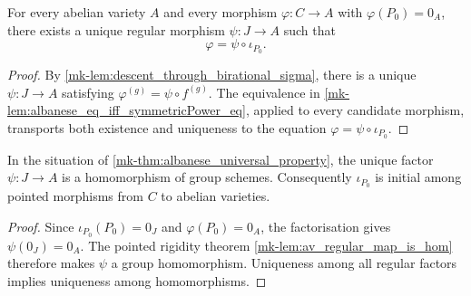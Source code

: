 \begin{theorem}
  \label{mk-thm:albanese_universal_property}


  For every abelian variety \(A\) and every morphism
  \(\varphi\colon C\to A\) with \(\varphi(P_0)=0_A\), there exists a unique
  regular morphism \(\psi\colon J\to A\) such that
  \[
    \varphi=\psi\circ\iota_{P_0}.
  \]
\end{theorem}

\begin{proof}
  By \ref{mk-lem:descent_through_birational_sigma}, there is a unique
  \(\psi\colon J\to A\) satisfying
  \(\varphi^{(g)}=\psi\circ f^{(g)}\).  The equivalence in
  \ref{mk-lem:albanese_eq_iff_symmetricPower_eq}, applied to every candidate
  morphism, transports both existence and uniqueness to the equation
  \(\varphi=\psi\circ\iota_{P_0}\).
\end{proof}

\begin{corollary}
  \label{mk-cor:albanese_universal_property_homomorphism}

  In the situation of \ref{mk-thm:albanese_universal_property}, the unique
  factor \(\psi\colon J\to A\) is a homomorphism of group schemes.
  Consequently \(\iota_{P_0}\) is initial among pointed morphisms from
  \(C\) to abelian varieties.
\end{corollary}

\begin{proof}
  Since \(\iota_{P_0}(P_0)=0_J\) and \(\varphi(P_0)=0_A\), the
  factorisation gives \(\psi(0_J)=0_A\).  The pointed rigidity theorem
  \ref{mk-lem:av_regular_map_is_hom} therefore makes \(\psi\) a group
  homomorphism.  Uniqueness among all regular factors implies uniqueness
  among homomorphisms.
\end{proof}
